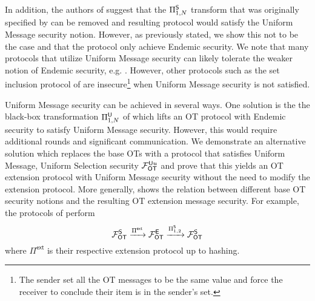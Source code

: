 In addition, the authors of \cite{C:KelOrsSch15,RSA:OrrOrsSch17} suggest that the $\Pi^{\mathsf{S}}_{1,N}$ transform that was originally specified by \cite{C:IKNP03} can be removed and resulting protocol would satisfy the Uniform Message security notion. However, as previously stated, we show this not to be the case and that the protocol only achieve Endemic security. We note that many protocols that utilize Uniform Message security can likely tolerate the weaker notion of Endemic security, e.g. \cite{EC:RinRos17,CCS:RinRos17}.  However, other protocols such as the set inclusion protocol of \cite[Figure 5]{RSA:OrrOrsSch17} are insecure\footnote{The sender set all the OT messages to be the same value and force the receiver to conclude their item is in the sender's set.} when Uniform Message security is not satisfied. 

Uniform Message security can be achieved in several ways. One solution is the the black-box transformation $\Pi^\mathsf{U}_{1,N}$ of  which lifts an OT protocol with Endemic security to satisfy Uniform Message security. However, this would require additional rounds and significant communication. We demonstrate an alternative solution which replaces the base OTs with a protocol that satisfies Uniform Message, Uniform Selection security $\mathcal{F}_{\mathsf{OT}}^{\mathsf{U} u}$ and prove that this yields an OT extension protocol with Uniform Message security without the need to modify the extension protocol. More generally,  shows the relation between different base OT security notions and the resulting OT extension message security. For example, the protocols of \cite{C:IKNP03,EC:ALSZ15, C:KelOrsSch15} perform
$$
\mathcal{F}_{\mathsf{OT}}^\mathsf{S} \xrightarrow{\Pi^{\textsf{ext}}} \mathcal{F}_{\mathsf{OT}}^\mathsf{E} \xrightarrow{\Pi^{\mathsf{S}}_{1,2}} \mathcal{F}_{\mathsf{OT}}^\mathsf{S}
$$
where $\Pi^\textsf{ext}$ is their respective extension protocol up to hashing.

